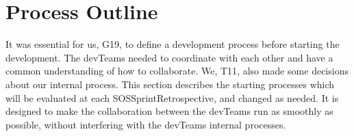 \chapter{Process Outline}

It was essential for us, \gls{G19}, to define a development process before starting the development. The \glspl{devTeam} needed to coordinate with each other and have a common understanding of how to collaborate. We, \gls{T11}, also made some decisions about our internal process. This section describes the starting processes which will be evaluated at each \gls{SOSSprintRetrospective}, and changed as needed. It is designed to make the collaboration between the \glspl{devTeam} run as smoothly as possible, without interfering with the \glspl{devTeam} internal processes.